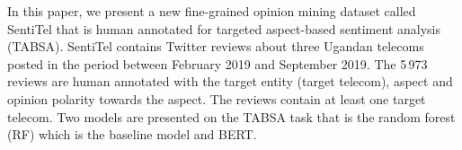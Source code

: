 In this paper, we present a new fine-grained opinion mining dataset called SentiTel that is human annotated for targeted aspect-based sentiment analysis (TABSA). SentiTel contains Twitter reviews about three Ugandan telecoms posted in the period between February 2019 and September 2019. The 5\,973 reviews are human annotated with the target entity (target telecom), aspect and opinion polarity towards the aspect. The reviews contain at least one target telecom. Two models are presented on the TABSA task that is the random forest (RF) which is the baseline model and BERT.
